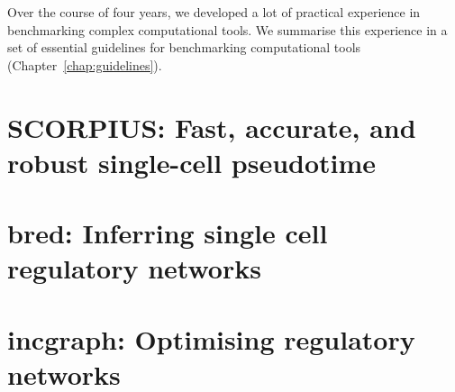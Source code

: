 Over the course of four years, we developed a lot of practical experience in benchmarking complex computational tools. We summarise this experience in a set of essential guidelines for benchmarking computational tools (Chapter~\ref{chap:guidelines}).


\section{SCORPIUS: Fast, accurate, and robust single-cell pseudotime}




\section{bred: Inferring single cell regulatory networks}


\section{incgraph: Optimising regulatory networks}


